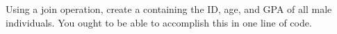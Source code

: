 \begin{problem}
Using a join operation, create a  containing the ID, age, and GPA of all male individuals.
You ought to be able to accomplish this in one line of code.
\end{problem}

